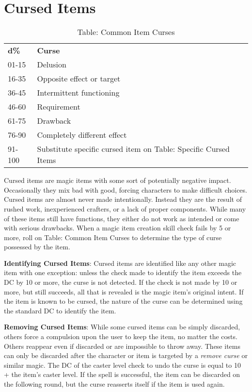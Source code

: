 \section{Cursed Items}

\label{f0}

\begin{table}[]
\sffamily
\caption{Table: Common Item Curses}
\begin{tabularx}{\linewidth}{lX}
\textbf{d\%} & \textbf{Curse}\\
01-15 & Delusion \\
 16-35 & Opposite effect or target \\
 36-45 & Intermittent functioning \\
 46-60 & Requirement \\
 61-75 & Drawback \\
 76-90 & Completely different effect \\
 91-100 & Substitute specific cursed item on Table: Specific Cursed Items\\
\end{tabularx}
\end{table}
		
Cursed items are magic items with some sort of potentially negative impact. Occasionally they mix bad with good, forcing characters to make difficult choices. Cursed items are almost never made intentionally. Instead they are the result of rushed work, inexperienced crafters, or a lack of proper components. While many of these items still have functions, they either do not work as intended or come with serious drawbacks. When a magic item creation skill check fails by 5 or more, roll on Table: Common Item Curses to determine the type of curse possessed by the item.
				
\textbf{Identifying Cursed Items}: Cursed items are identified like any other magic item with one exception: unless the check made to identify the item exceeds the DC by 10 or more, the curse is not detected. If the check is not made by 10 or more, but still succeeds, all that is revealed is the magic item's original intent. If the item is known to be cursed, the nature of the curse can be determined using the standard DC to identify the item.
				
\textbf{Removing Cursed Items}: While some cursed items can be simply discarded, others force a compulsion upon the user to keep the item, no matter the costs. Others reappear even if discarded or are impossible to throw away. These items can only be discarded after the character or item is targeted by a \textit{remove curse} or similar magic. The DC of the caster level check to undo the curse is equal to 10 + the item's caster level. If the spell is successful, the item can be discarded on the following round, but the curse reasserts itself if the item is used again.
				
